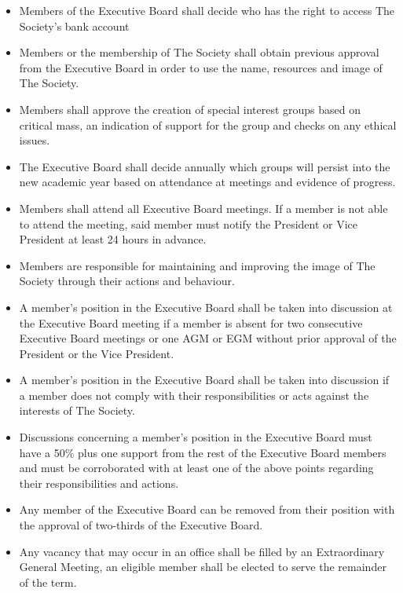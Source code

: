 \begin{itemize}

    \item{Members of the Executive Board shall decide who has the right to access The Society’s bank account}

    \item{Members or the membership of The Society shall obtain previous approval from the Executive Board in order to use the name, resources and image of The Society.}

    \item{Members shall approve the creation of special interest groups based on critical mass, an indication of support for the group and checks on any ethical issues.}

    \item{The Executive Board shall decide annually which groups will persist into the new academic year based on attendance at meetings and evidence of progress.}

    \item{Members shall attend all Executive Board meetings. If a member is not able to attend the meeting, said member must notify the President or Vice President at least 24 hours in advance.}

    \item{Members are responsible for maintaining and improving the image of The Society through their actions and behaviour.}

    \item{A member's position in the Executive Board shall be taken into discussion at the Executive Board meeting if a member is absent for two consecutive Executive Board meetings or one AGM or EGM without prior approval of the President or the Vice President.}

    \item{A member's position in the Executive Board shall be taken into discussion if a member does not comply with their responsibilities or acts against the interests of The Society.}

    \item{Discussions concerning a member's position in the Executive Board must have a 50\% plus one support from the rest of the Executive Board members and must be corroborated with at least one of the above points regarding their responsibilities and actions.}

    \item{Any member of the Executive Board can be removed from their position with the approval of two-thirds of the Executive Board.}

    \item{Any vacancy that may occur in an office shall be filled by an Extraordinary General Meeting, an eligible member shall be elected to serve the remainder of the term. }

\end{itemize}

